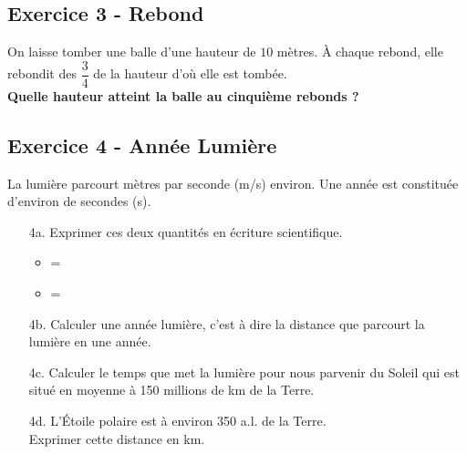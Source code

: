 \documentclass[12pt]{article}
\begin{document}
\subsection*{Exercice 3 - Rebond}

On laisse tomber une balle d'une hauteur de $10$ mètres. À chaque rebond, elle rebondit des $\dfrac{3}{4}$ de la hauteur d'où elle est tombée.\\

\textbf{Quelle hauteur atteint la balle au cinquième rebonds ?}


\subsection*{Exercice 4 - Année Lumière}

La  lumière  parcourt    mètres  par  seconde  (m/s)  environ. Une année est constituée d’environ  de secondes (s).

\begin{enumerate}

\item[4a.] Exprimer ces deux quantités en écriture scientifique. 
  \begin{itemize}
  \item {} = 
  \item {} = 
  \end{itemize}

\item[4b.] Calculer une année lumière, c’est à dire la distance que parcourt la lumière en une année.

\item[4c.] Calculer le temps que met la lumière pour nous parvenir du Soleil qui est situé en 
  moyenne à 150 millions de km de la Terre.

\item[4d.] L'Étoile polaire est à environ 350  a.l. de la Terre.\\
Exprimer cette distance en km.
\end{enumerate}
\end{document}
